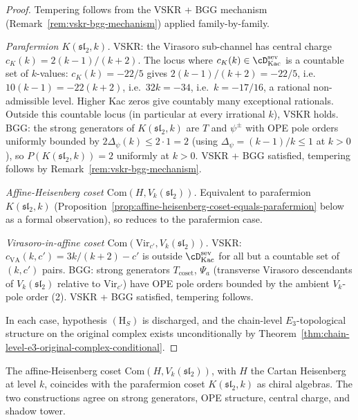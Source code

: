 \begin{proof}
Tempering follows from the VSKR + BGG mechanism
(Remark~\ref{rem:vskr-bgg-mechanism}) applied family-by-family.

\emph{Parafermion $K(\mathfrak{sl}_2, k)$.} VSKR: the Virasoro
sub-channel has central charge $c_K(k) = 2(k - 1) / (k + 2)$. The
locus where $c_K(k) \in \cD^{\mathrm{sev}}_{\mathrm{Kac}}$ is a
countable set of $k$-values: $c_K(k) = -22/5$ gives
$2(k - 1)/(k + 2) = -22/5$, i.e.\ $10(k - 1) = -22(k + 2)$, i.e.\
$32 k = -34$, i.e.\ $k = -17/16$, a rational non-admissible
level. Higher Kac zeros give countably many exceptional rationals.
Outside this countable locus (in particular at every irrational $k$),
VSKR holds. BGG: the strong generators of $K(\mathfrak{sl}_2, k)$
are $T$ and $\psi^\pm$ with OPE pole orders uniformly bounded by
$2 \Delta_\psi(k) \le 2 \cdot 1 = 2$ (using
$\Delta_\psi = (k - 1)/k \le 1$ at $k > 0$), so
$P(K(\mathfrak{sl}_2, k)) = 2$ uniformly at $k > 0$. VSKR + BGG
satisfied, tempering follows by
Remark~\ref{rem:vskr-bgg-mechanism}.

\emph{Affine-Heisenberg coset
$\mathrm{Com}(H, V_k(\mathfrak{sl}_2))$.} Equivalent to parafermion
$K(\mathfrak{sl}_2, k)$
(Proposition~\ref{prop:affine-heisenberg-coset-equals-parafermion}
below as a formal observation), so reduces to the parafermion case.

\emph{Virasoro-in-affine coset
$\mathrm{Com}(\mathrm{Vir}_{c'}, V_k(\mathfrak{sl}_2))$.} VSKR:
$c_{\mathrm{VA}}(k, c') = 3 k / (k + 2) - c'$ is outside
$\cD^{\mathrm{sev}}_{\mathrm{Kac}}$ for all but a countable set of
$(k, c')$ pairs. BGG: strong generators $T_{\mathrm{coset}}$,
$\Psi_a$ (transverse Virasoro descendants of $V_k(\mathfrak{sl}_2)$
relative to $\mathrm{Vir}_{c'}$) have OPE pole orders bounded by the
ambient $V_k$-pole order (2). VSKR + BGG satisfied, tempering
follows.

In each case, hypothesis $(\mathrm{H}_S)$ is discharged, and the
chain-level $E_3$-topological structure on the original complex
exists unconditionally by
Theorem~\ref{thm:chain-level-e3-original-complex-conditional}.
\end{proof}

\begin{proposition}
\label{prop:affine-heisenberg-coset-equals-parafermion}
\ClaimStatusProvedHere
The affine-Heisenberg coset
$\mathrm{Com}(H, V_k(\mathfrak{sl}_2))$, with $H$ the Cartan
Heisenberg at level $k$, coincides with the parafermion coset
$K(\mathfrak{sl}_2, k)$ as chiral algebras. The two constructions
agree on strong generators, OPE structure, central charge, and
shadow tower.
\end{proposition}

